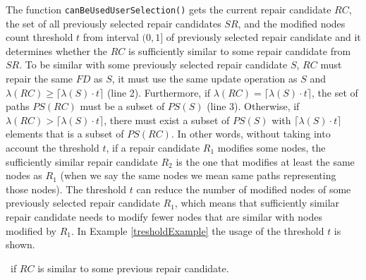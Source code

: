 The function \texttt{canBeUsedUserSelection()} gets the current repair candidate $RC$, the set of all previously selected repair candidates $SR$, and the modified nodes count threshold $t$ from interval $(0,1]$ of previously selected repair candidate and it determines whether the $RC$ is sufficiently similar to some repair candidate from $SR$. To be similar with some previously selected repair candidate $S$, $RC$ must repair the same $FD$ as $S$, it must use the same update operation as $S$ and $\lambda(RC) \geq \lceil\lambda(S) \cdot t\rceil$ (line 2). Furthermore, if $\lambda(RC) = \lceil\lambda(S) \cdot t\rceil$, the set of paths $PS(RC)$ must be a subset of $PS(S)$ (line 3). Otherwise, if $\lambda(RC) > \lceil\lambda(S) \cdot t\rceil$, there must exist a subset of $PS(S)$ with $\lceil\lambda(S) \cdot t\rceil$ elements that is a subset of $PS(RC)$. In other words, without taking into account the threshold $t$, if a repair candidate $R_1$ modifies some nodes, the sufficiently similar repair candidate $R_2$ is the one that modifies at least the same nodes as $R_1$ (when we say the same nodes we mean same paths representing those nodes). The threshold $t$ can reduce the number of modified nodes of some previously selected repair candidate $R_1$, which means that sufficiently similar repair candidate needs to modify fewer nodes that are similar with nodes modified by $R_1$. In Example \ref{tresholdExample} the usage of the threshold $t$ is shown.


\begin{algorithm}
\caption{$canBeUsedUserSelection(SR, t, RC)$}
\label{canUserSel}
\begin{algorithmic}[1]
\REQUIRE{\ \\
$SR$: the set of previously selected repair candidates by the user\\
$t$: a suitability threshold $(0,1]$ of previously selected repair candidates\\
$RC$: the current repair candidate}
\ENSURE \TRUE\ if $RC$ is similar to some previous repair candidate.
            \RETURN \TRUE
        \ENDIF
            \RETURN \TRUE
        \ENDIF
   \ENDIF
\ENDFOR
\RETURN \FALSE
\end{algorithmic}
\end{algorithm}

